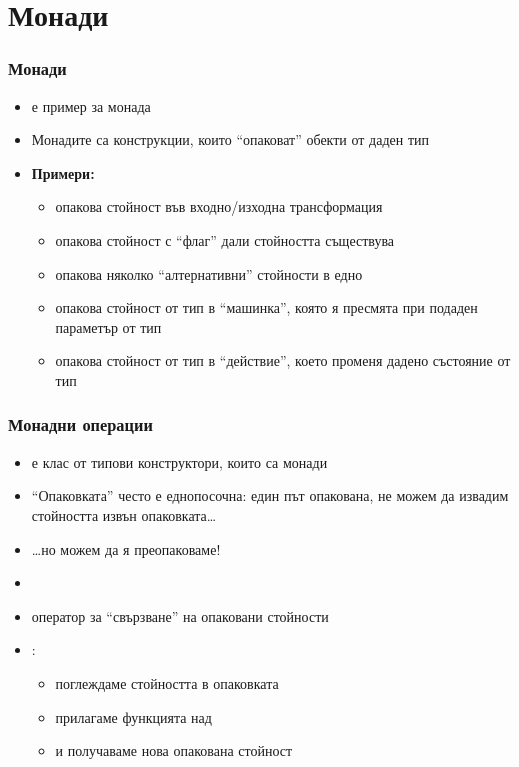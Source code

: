 \documentclass[alsotrans]{beamerswitch}
\begin{document}
\section{Монади}

\begin{frame}
  \frametitle{Монади}

  \begin{itemize}[<+->]
  \item {} е пример за \alert{монада}
  \item Монадите са конструкции, които ``опаковат'' обекти от даден тип
  \item \textbf{Примери:}
    \begin{itemize}
    \item {} опакова стойност във входно/изходна трансформация
    \item {} опакова стойност с ``флаг'' дали стойността съществува
    \item \lst{[a]} опакова няколко ``алтернативни'' стойности в едно
    \item {} опакова стойност от тип  в ``машинка'', която я пресмята при подаден параметър от тип 
    \item {} опакова стойност от тип  в ``действие'', което променя дадено състояние от тип 
    \end{itemize}
  \end{itemize}
\end{frame}

\begin{frame}
  \frametitle{Монадни операции}

  \begin{itemize}[<+->]
  \item {} е клас от \alert{типови конструктори}, които
    са монади
  \item ``Опаковката'' често е \alert{еднопосочна}: един път опакована, не можем да извадим стойността извън опаковката\ldots
  \item \ldots но можем да я преопаковаме!
  \item {}
  \item оператор за ``свързване'' на опаковани стойности
  \item {}:
    \begin{itemize}
    \item поглеждаме стойността  в опаковката 
    \item прилагаме функцията  над 
    \item и получаваме нова опакована стойност 
    \end{itemize}
  \end{itemize}
\end{frame}
\end{document}
